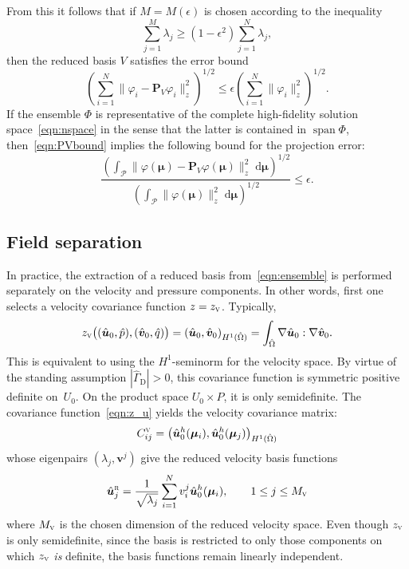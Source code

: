 \documentclass[onecolumn, twoside, a4paper, 11pt]{article}
\newcommand{\dd}{{\;\mathrm{d}}}
\begin{document}
From this it follows that if $M = M(\epsilon)$ is chosen according to the inequality
\begin{equation}
  \label{eqn:error}
  \sum_{j=1}^M \lambda_j
  \geq \left(1 - \epsilon^2\right) \sum_{j=1}^N \lambda_j,
\end{equation}
%
then the reduced basis $V$ satisfies the error bound
%
\begin{equation}
\label{eqn:PVbound}
\left( \sum_{i=1}^N \big\| \varphi_i - \bm P_V \varphi_i \big\|_z^2 \right)^{1/2}
  \leq \epsilon \left( \sum_{i=1}^N \big\| \varphi_i \big\|_z^2 \right)^{1/2}.
\end{equation}
%
If the ensemble $\Phi$ is representative of the complete high-fidelity solution space~\eqref{eqn:nspace}
in the sense that the latter is contained in $\operatorname{span}\Phi$, then~\eqref{eqn:PVbound}
implies the following bound for the projection error:
%
\begin{equation}
\label{eqn:RBerror}
\frac{\left( \int_\mathcal{P}\big\|\varphi(\bm \mu) - \bm P_V \varphi(\bm \mu)\big\|_z^2\dd\bm \mu \right)^{1/2}}
{\left( \int_\mathcal{P} \big\| \varphi(\bm \mu) \big\|_z^2 \dd\bm \mu \right)^{1/2}}
  \leq \epsilon
  .
\end{equation}
%


\subsection{Field separation}
In practice, the extraction of a reduced basis from~\eqref{eqn:ensemble} is performed separately
on the velocity and pressure components. In other words, first one selects a velocity covariance
function $z=z_\textsc{v}$. Typically,
%
\begin{equation}
\label{eqn:z_u}
z_\textsc{v}\big((\hat{\bm u}_0, \hat{p}), (\hat{\bm v}_0, \hat{q})\big) =
  \left( \hat{\bm u}_0, \hat{\bm v}_0 \right)_{H^1(\hat{\Omega})}
  = \int_{\hat{\Omega}} \nabla \hat{\bm u}_0 : \nabla \hat{\bm v}_0.
\end{equation}
%
This is equivalent to using the $H^1$-seminorm for the velocity space. By virtue of the standing
assumption $|\hat{\Gamma}_\text{D}| > 0$, this covariance function is
symmetric positive definite on~$U_0$. On the product space $U_0 \times P$, it is only semidefinite.
The covariance function~\eqref{eqn:z_u} yields the velocity covariance matrix:
%
\begin{equation}
  C^{\textsc{v}}_{ij} = \left( \hat{\bm u}^h_0(\bm{\mu}_i), \hat{\bm u}^h_0(\bm{\mu}_j) \right)_{H^1(\hat{\Omega})}
\end{equation}
%
whose eigenpairs $(\lambda_j, \bm v^{j})$ give the reduced velocity
basis functions
%
\begin{equation}
\label{eqn:uRj}
  \hat{\bm u}^\textsc{r}_j = \frac{1}{\sqrt{\lambda_j}} \sum_{i=1}^N v^{j}_i \hat{\bm u}^h_0(\bm{\mu}_i),
  \qquad 1 \leq j \leq M_\textsc{v}
\end{equation}
%
where $M_\textsc{v}$ is the chosen dimension of the reduced velocity space. Even though
$z_\textsc{v}$ is only semidefinite, since the basis is restricted to only those
components on which $z_\textsc{v}$ \emph{is} definite, the basis functions remain
linearly independent.
\end{document}

